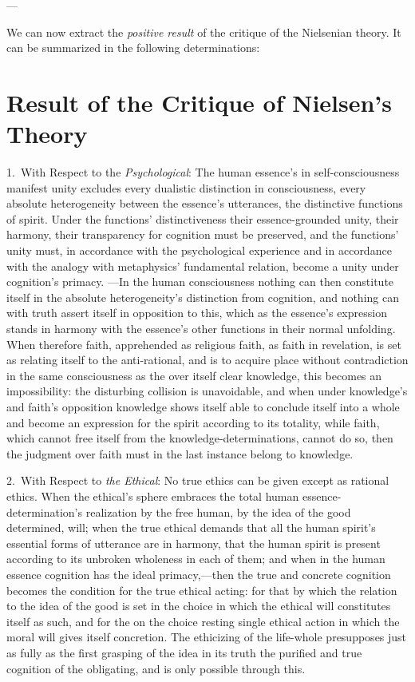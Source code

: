 \documentclass[12pt,a4paper]{book}
\begin{document}
\begin{center}---\end{center}

We can now extract the \emph{positive result} of the critique of the Nielsenian theory. It can be summarized in the following
determinations:

\section{Result of the Critique of Nielsen's Theory}
\label{sec:nielsen-result}

1.~With Respect to the \emph{Psychological}: The human essence's in self-consciousness manifest
unity excludes every dualistic distinction in consciousness, every absolute heterogeneity between
the essence's utterances, the distinctive functions of spirit. Under the functions' distinctiveness
their essence-grounded unity, their harmony, their transparency for cognition must be preserved, and
the functions' unity must, in accordance with the psychological experience and in accordance with the
analogy with metaphysics' fundamental relation, become a unity under cognition's primacy. ---In the
human consciousness nothing can then constitute itself in the absolute heterogeneity's distinction
from cognition, and nothing can with truth assert itself in opposition to this, which as the essence's
expression stands in harmony with the essence's other functions in their normal unfolding. When
therefore faith, apprehended as religious faith, as faith in revelation, is set as relating itself to
the anti-rational, and is to acquire place without contradiction in the same consciousness as the over
itself clear knowledge, this becomes an impossibility: the disturbing collision is unavoidable, and
when under knowledge's and faith's opposition knowledge shows itself able to conclude itself into a
whole and become an expression for the spirit according to its totality, while faith, which cannot free
itself from the knowledge-determinations, cannot do so, then the judgment over faith must in the last
instance belong to knowledge.

2.~With Respect to \emph{the Ethical}: No true ethics can be given except as rational ethics. When the
ethical's sphere embraces the total human essence-determination's realization by the free human, by the
idea of the good determined, will; when the true ethical demands that all the human spirit's essential
forms of utterance are in harmony, that the human spirit is present according to its unbroken wholeness
in each of them; and when in the human essence cognition has the ideal primacy,---then the true and
concrete cognition becomes the condition for the true ethical acting: for that by which the relation to
the idea of the good is set in the choice in which the ethical will constitutes itself as such, and for
the on the choice resting single ethical action in which the moral will gives itself concretion. The
ethicizing of the life-whole presupposes just as fully as the first grasping of the idea in its truth the
purified and true cognition of the obligating, and is only possible through this.
\end{document}
